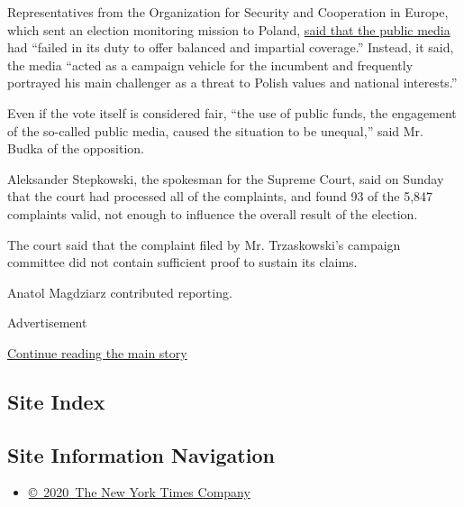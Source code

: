 Representatives from the Organization for Security and Cooperation in
Europe, which sent an election monitoring mission to Poland,
\href{https://www.osce.org/files/f/documents/4/9/455728.pdf}{said that
the public media} had ``failed in its duty to offer balanced and
impartial coverage.'' Instead, it said, the media ``acted as a campaign
vehicle for the incumbent and frequently portrayed his main challenger
as a threat to Polish values and national interests.''

Even if the vote itself is considered fair, ``the use of public funds,
the engagement of the so-called public media, caused the situation to be
unequal,'' said Mr. Budka of the opposition.

Aleksander Stepkowski, the spokesman for the Supreme Court, said on
Sunday that the court had processed all of the complaints, and found 93
of the 5,847 complaints valid, not enough to influence the overall
result of the election.

The court said that the complaint filed by Mr. Trzaskowski's campaign
committee did not contain sufficient proof to sustain its claims.

Anatol Magdziarz contributed reporting.

Advertisement

\protect\hyperlink{after-bottom}{Continue reading the main story}

\hypertarget{site-index}{%
\subsection{Site Index}\label{site-index}}

\hypertarget{site-information-navigation}{%
\subsection{Site Information
Navigation}\label{site-information-navigation}}

\begin{itemize}
\tightlist
\item
  \href{https://help.nytimes.com/hc/en-us/articles/115014792127-Copyright-notice}{©~2020~The
  New York Times Company}
\end{itemize}

